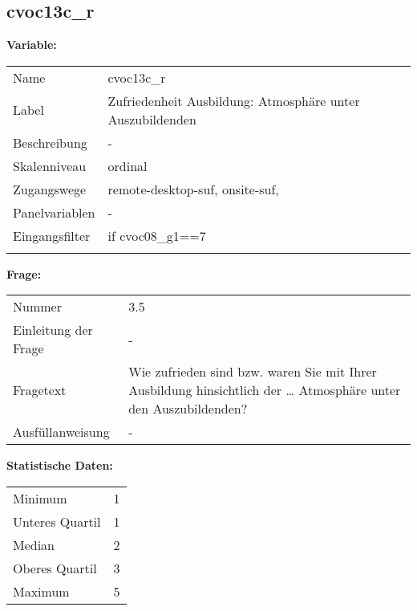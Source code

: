 	
	
	\subsection{cvoc13c\_r}
	\label{subSection:cvoc13c_r}

	\noindent\textbf{Variable:}\\
		\begin{tabular}{lL{11.3cm}}
			\label{tableVariable:cvoc13c_r}
			Name & cvoc13c\_r \\
			Label & Zufriedenheit Ausbildung: Atmosphäre unter Auszubildenden \\
			Beschreibung & - \\
			Skalenniveau & ordinal \\
			Zugangswege &
				remote-desktop-suf,
				onsite-suf,
 \\
			Panelvariablen & -
			 \\
			Eingangsfilter & if cvoc08\_g1==7 \\
 \\
		\end{tabular}

		\vspace*{1 cm}
		\noindent\textbf{Frage:}\\
		\begin{tabular}{lL{11.3cm}}
			\label{tableQuestion:cvoc13c_r}
			Nummer & 3.5 \\
			Einleitung der Frage & - \\
			Fragetext & Wie zufrieden sind bzw. waren Sie mit Ihrer Ausbildung hinsichtlich der …
Atmosphäre unter den Auszubildenden? \\
			Ausfüllanweisung & - \\
		\end{tabular}


		\vspace*{1 cm}
		\noindent\textbf{Statistische Daten:}\\
			\begin{tabular}{ll}
				\label{tableStatistics:cvoc13c_r}
					Minimum & 1 \\
					Unteres Quartil & 1 \\
					Median & 2 \\
					Oberes Quartil & 3 \\
					Maximum & 5 \\
			\end{tabular}



